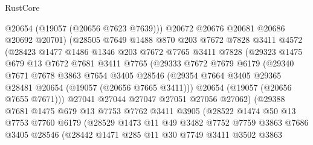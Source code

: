 \begin{lexlean}{RustCore}
\begin{coremodule}
                  @20654
                  (@19057 (@20656 @7623 @7639)))
                @20672
                @20676
                @20681
                @20686
                @20692
                @20701)
              (@28505
                @7649
                @1488
                @870
                @203
                @7672
                @7828
                @3411
                @4572
                (@28423
                  @1477
                  @1486
                  @1346
                  @203
                  @7672
                  @7765
                  @3411
                  @7828
                  (@29323
                    @1475
                    @679
                    @13
                    @7672
                    @7681
                    @3411
                    @7765
                    (@29333
                      @7672
                      @7679
                      @6179
                      (@29340
                        @7671
                        @7678
                        @3863
                        @7654
                        @3405
                        @28546
                        (@29354 @7664 @3405 @29365 @28481 @20654 (@19057 (@20656 @7665 @3411)))
                        @20654
                        (@19057 (@20656 @7655 @7671)))
                      @27041
                      @27044
                      @27047
                      @27051
                      @27056
                      @27062)
                    (@29388
                      @7681
                      @1475
                      @679
                      @13
                      @7753
                      @7762
                      @3411
                      @3905
                      (@28522
                        @1474
                        @50
                        @13
                        @7753
                        @7760
                        @6179
                        (@28529
                          @1473
                          @11
                          @49
                          @3482
                          @7752
                          @7759
                          @3863
                          @7686
                          @3405
                          @28546
                          (@28442
                            @1471
                            @285
                            @11
                            @30
                            @7749
                            @3411
                            @3502
                            @3863

\end{coremodule}
\end{lexlean}
